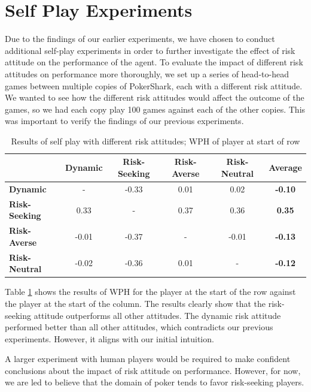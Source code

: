 \section{Self Play Experiments}
Due to the findings of our earlier experiments, we have chosen to conduct additional self-play experiments in order to further investigate the effect of risk attitude on the performance of the agent. To evaluate the impact of different risk attitudes on performance more thoroughly, we set up a series of head-to-head games between multiple copies of PokerShark, each with a different risk attitude. We wanted to see how the different risk attitudes would affect the outcome of the games, so we had each copy play 100 games against each of the other copies. This was important to verify the findings of our previous experiments.

\begin{table}[h]
    \centering
\begin{tabular}{l|c|c|c|c|c|}
\cline{2-6}
                                            & \textbf{Dynamic} & \textbf{Risk-Seeking} & \textbf{Risk-Averse} & \textbf{Risk-Neutral} & \textbf{Average} \\ \hline
\multicolumn{1}{|l|}{\textbf{Dynamic}}      & -                & -0.33                 & 0.01                 & 0.02                  & \textbf{-0.10}   \\ \hline
\multicolumn{1}{|l|}{\textbf{Risk-Seeking}} & 0.33             & -                     & 0.37                 & 0.36                  & \textbf{0.35}    \\ \hline
\multicolumn{1}{|l|}{\textbf{Risk-Averse}}  & -0.01            & -0.37                 & -                    & -0.01                 & \textbf{-0.13}   \\ \hline
\multicolumn{1}{|l|}{\textbf{Risk-Neutral}} & -0.02            & -0.36                 & 0.01                 & -                     & \textbf{-0.12}   \\ \hline
\end{tabular}
\caption{Results of self play with different risk attitudes; WPH of player at start of row}
\label{table:selfPlay}
\end{table}

Table \ref{table:selfPlay} shows the results of WPH for the player at the start of the row against the player at the start of the column. The results clearly show that the risk-seeking attitude outperforms all other attitudes. The dynamic risk attitude performed better than all other attitudes, which contradicts our previous experiments. However, it aligns with our initial intuition.

A larger experiment with human players would be required to make confident conclusions about the impact of risk attitude on performance. However, for now, we are led to believe that the domain of poker tends to favor risk-seeking players.